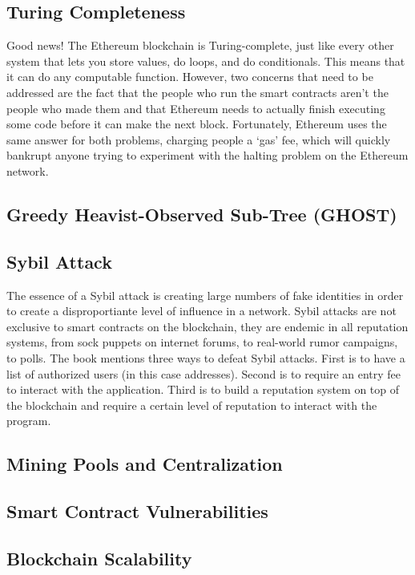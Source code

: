 \documentclass{article}
\begin{document}
\subsection{Turing Completeness}
Good news! The Ethereum blockchain is Turing-complete, just like every other system that lets you store values, do loops, and do conditionals. This means that it can do any computable function. However, two concerns that need to be addressed are the fact that the people who run the smart contracts aren't the people who made them and that Ethereum needs to actually finish executing some
code before it can make the next block. Fortunately, Ethereum uses the same answer for both problems, charging people a `gas' fee,
which will quickly bankrupt anyone trying to experiment with the halting problem on the Ethereum network.

\subsection{Greedy Heavist-Observed Sub-Tree (GHOST)}

\subsection{Sybil Attack}
The essence of a Sybil attack is creating large numbers of fake identities in order to create a disproportiante level of influence
in a network. Sybil attacks are not exclusive to smart contracts on the blockchain, they are endemic in all reputation systems, from
sock puppets on internet forums, to real-world rumor campaigns, to polls. The book mentions three ways to defeat Sybil attacks.
First is to have a list of authorized users (in this case addresses). Second is to require an entry fee to interact with the application.
Third is to build a reputation system on top of the blockchain and require a certain level of reputation to interact with the program.

\subsection{Mining Pools and Centralization}

\subsection{Smart Contract Vulnerabilities}

\subsection{Blockchain Scalability}
\end{document}
